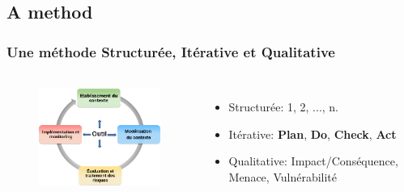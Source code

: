 \documentclass[]{beamer}
\begin{document}
\subsection{A method}
\begin{frame}
    \frametitle{Une méthode Structurée, Itérative et Qualitative}
    \framesubtitle{}
    \begin{columns}[t]
        \column{6.0cm}
        \begin{figure}
        \includegraphics[width=6.0cm]{./images/MONARC-method-1.png}
        \end{figure}
        \column{6cm}
        \begin{itemize}
                \item Structurée: 1, 2, ..., n.
                \item Itérative: \textbf{Plan}, \textbf{Do}, \textbf{Check}, \textbf{Act}
                \item Qualitative: Impact/Conséquence, Menace, Vulnérabilité
        \end{itemize}
        \end{columns}
\end{frame}
\end{document}
